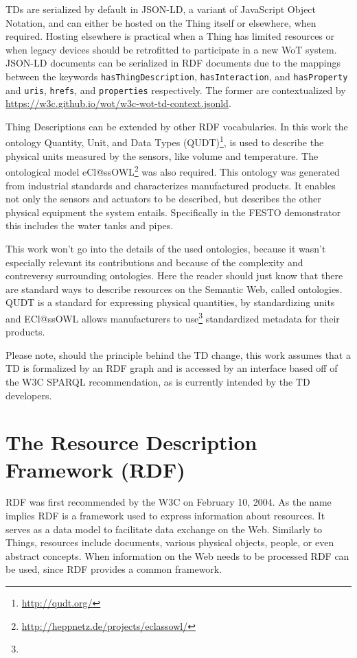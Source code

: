 TDs are serialized by default in JSON-LD, a variant of JavaScript Object Notation, and can either be hosted on the Thing itself or elsewhere, when required. Hosting elsewhere is practical when a Thing has limited resources or when legacy devices should be retrofitted to participate in a new WoT system. JSON-LD documents can be serialized in RDF documents due to the mappings between the keywords \texttt{hasThingDescription}, \texttt{hasInteraction}, and \texttt{hasProperty} and \texttt{uris}, \texttt{hrefs}, and \texttt{properties} respectively. The former are contextualized by \url{https://w3c.github.io/wot/w3c-wot-td-context.jsonld}. 



Thing Descriptions can be extended by other RDF vocabularies\cite{Kabisch.2017}. In this work the ontology Quantity, Unit, and Data Types (QUDT)\footnote{\url{http://qudt.org/}}, is used to describe the physical units measured by the sensors, like volume and temperature. The ontological model eCl@ssOWL\footnote{\url{http://heppnetz.de/projects/eclassowl/}} was also required. This ontology was generated from industrial standards and characterizes manufactured products. It enables not only the sensors and actuators to be described, but describes the other physical equipment the system entails. Specifically in the FESTO demonstrator this includes the water tanks and pipes.

This work won't go into the details of the used ontologies, because it wasn't especially relevant its contributions and because of the complexity and contreversy surrounding ontologies. Here the reader should just know that there are standard ways to describe resources on the Semantic Web, called ontologies. QUDT is a standard for expressing physical quantities, by standardizing units and ECl@ssOWL allows manufacturers to use\footnote{} standardized metadata for their products.



Please note, should the principle behind the TD change, this work assumes that a TD is formalized by an RDF graph and is accessed by an interface based off of the W3C SPARQL recommendation, as is currently intended by the TD developers.



\section{The Resource Description Framework (RDF)}
RDF was first recommended by the W3C on February 10, 2004. As the name implies RDF is a framework used to express information about resources. It serves as a data model to facilitate data exchange on the Web. Similarly to Things, resources include documents, various physical objects, people, or even abstract concepts. When information on the Web needs to be processed RDF can be used, since RDF provides a common framework.


